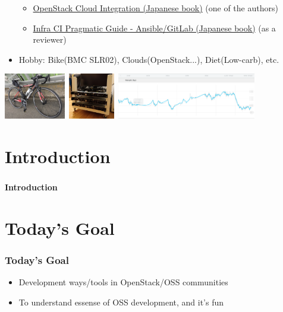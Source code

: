 \documentclass[aspectratio=169,11pt,hyperref={colorlinks=true}]{beamer}
\begin{document}
\begin{frame}
\begin{itemize}
      \begin{itemize}
      \item \href{https://www.amazon.co.jp/dp/4798139785/}{\scriptsize{OpenStack
        Cloud Integration (Japanese book)}} (one of the authors)
      \item \href{https://www.amazon.co.jp/dp/4798155128/}{\scriptsize{Infra CI
        Pragmatic Guide - Ansible/GitLab (Japanese book)}} (as a reviewer)
      \end{itemize}
    \item Hobby: Bike(BMC SLR02), Clouds(OpenStack...), Diet(Low-carb), etc.
  \end{itemize}
  \includegraphics[height=20mm]{images/my-bike.jpg}~\includegraphics[height=20mm]{images/server_front.jpg}~\includegraphics[height=20mm]{images/my-weight.png}
\end{frame}

\section{Introduction}
\begin{frame}
  \frametitle{ }
  \Huge{\bf{Introduction}}
\end{frame}

\section{Today's Goal}
\begin{frame}
  \frametitle{Today's Goal}
  \begin{itemize}
    \item Development ways/tools in OpenStack/OSS communities
    \item To understand essense of OSS development, and it's fun
  \end{itemize}
\end{frame}
\end{document}
